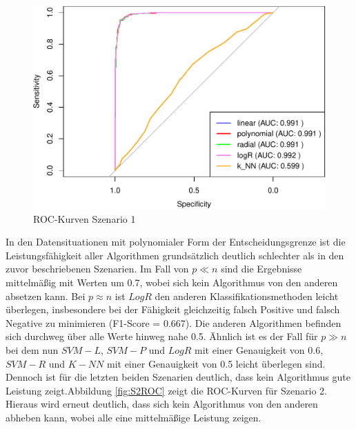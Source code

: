 \documentclass[
]{article}
\begin{document}
\begin{figure}

{\centering \includegraphics{Ergebnisse_files/figure-latex/S1ROC-1} 

}

\caption{ROC-Kurven Szenario 1}\label{fig:S1ROC}
\end{figure}

In den Datensituationen mit polynomialer Form der Entscheidungsgrenze
ist die Leistungsfähigkeit aller Algorithmen grundsätzlich deutlich
schlechter als in den zuvor beschriebenen Szenarien. Im Fall von
\(p \ll n\) sind die Ergebnisse mittelmäßig mit Werten um 0.7, wobei
sich kein Algorithmus von den anderen absetzen kann. Bei \(p \approx n\)
ist \(LogR\) den anderen Klassifikationsmethoden leicht überlegen,
insbesondere bei der Fähigkeit gleichzeitig falsch Positive und falsch
Negative zu minimieren (F1-Score = 0.667). Die anderen Algorithmen
befinden sich durchweg über alle Werte hinweg nahe 0.5. Ähnlich ist es
der Fall für \(p \gg n\) bei dem nun \(SVM-L\), \(SVM-P\) und \(LogR\)
mit einer Genauigkeit von 0.6, \(SVM-R\) und \(K-NN\) mit einer
Genauigkeit von 0.5 leicht überlegen sind. Dennoch ist für die letzten
beiden Szenarien deutlich, dass kein Algorithmus gute Leistung
zeigt.\newline Abbildung \ref{fig:S2ROC} zeigt die ROC-Kurven für
Szenario 2. Hieraus wird erneut deutlich, dass sich kein Algorithmus von
den anderen abheben kann, wobei alle eine mittelmäßige Leistung zeigen.
\end{document}
